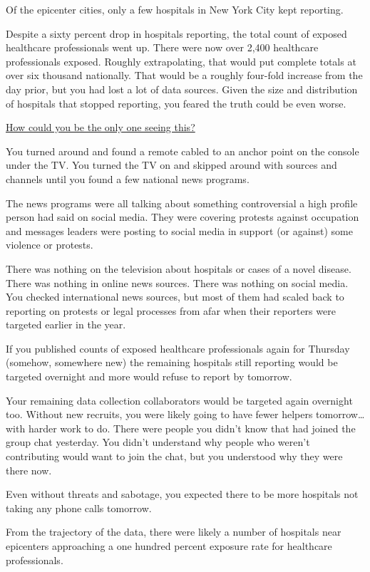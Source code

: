 \documentclass[17pt, twoside, a5paper, openright, extrafontsizes]{memoir}
\renewcommand{\emph}[1]{\ul{#1}}
\begin{document}
Of the epicenter cities, only a few hospitals in New York City kept
reporting.

Despite a sixty percent drop in hospitals reporting, the total count of
exposed healthcare professionals went up. There were now over 2,400
healthcare professionals exposed. Roughly extrapolating, that would put
complete totals at over six thousand nationally. That would be a roughly
four-fold increase from the day prior, but you had lost a lot of data
sources. Given the size and distribution of hospitals that stopped
reporting, you feared the truth could be even worse.

\emph{How could you be the only one seeing this?}

You turned around and found a remote cabled to an anchor point on the
console under the TV. You turned the TV on and skipped around with
sources and channels until you found a few national news programs.

The news programs were all talking about something controversial a high
profile person had said on social media. They were covering protests
against occupation and messages leaders were posting to social media in
support (or against) some violence or protests.

There was nothing on the television about hospitals or cases of a novel
disease. There was nothing in online news sources. There was nothing on
social media. You checked international news sources, but most of them
had scaled back to reporting on protests or legal processes from afar
when their reporters were targeted earlier in the year.

If you published counts of exposed healthcare professionals again for
Thursday (somehow, somewhere new) the remaining hospitals still
reporting would be targeted overnight and more would refuse to report by
tomorrow.

Your remaining data collection collaborators would be targeted again
overnight too. Without new recruits, you were likely going to have fewer
helpers tomorrow\ldots{} with harder work to do. There were people you
didn't know that had joined the group chat yesterday. You didn't
understand why people who weren't contributing would want to join the
chat, but you understood why they were there now.

Even without threats and sabotage, you expected there to be more
hospitals not taking any phone calls tomorrow.

From the trajectory of the data, there were likely a number of hospitals
near epicenters approaching a one hundred percent exposure rate for
healthcare professionals.
\end{document}
